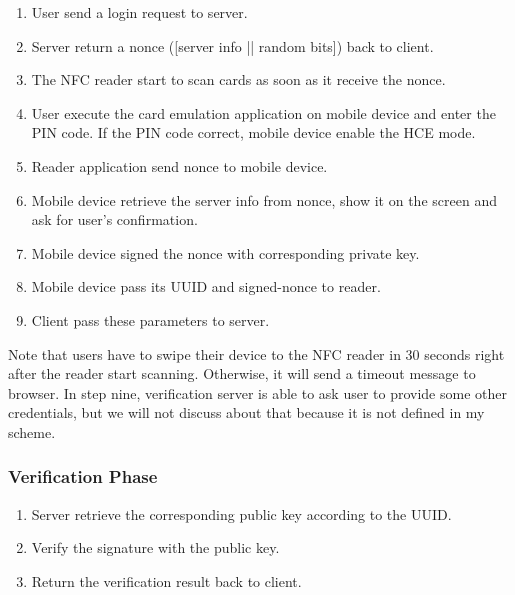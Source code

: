 \begin{CJK}{Bg5}{bsmi}
\begin{enumerate}
\item User send a login request to server.
\item Server return a nonce ([server info || random bits]) back to client.
\item The NFC reader start to scan cards as soon as it receive the nonce.
\item User execute the card emulation application on mobile device and enter the PIN code. If the PIN code correct, mobile device enable the HCE mode.
\item Reader application send nonce to mobile device.
\item Mobile device retrieve the server info from nonce, show it on the screen and ask for user's confirmation.
\item Mobile device signed the nonce with corresponding private key.
\item Mobile device pass its UUID and signed-nonce to reader.
\item Client pass these parameters to server.
\end{enumerate}

Note that users have to swipe their device to the NFC reader in 30 seconds right after the reader start scanning. Otherwise, it will send a timeout message to browser. In step nine, verification server is able to ask user to provide some other credentials, but we will not discuss about that because it is not defined in my scheme.

\subsubsection{Verification Phase}

\begin{enumerate}
\item Server retrieve the corresponding public key according to the UUID.
\item Verify the signature with the public key.
\item Return the verification result back to client.
\end{enumerate}

\end{CJK}
